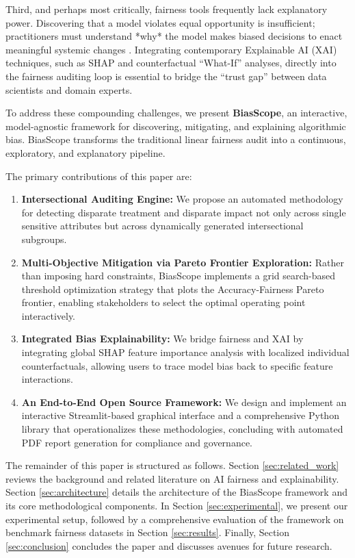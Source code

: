 \documentclass[conference]{IEEEtran}
\begin{document}
Third, and perhaps most critically, fairness tools frequently lack explanatory power. Discovering that a model violates equal opportunity is insufficient; practitioners must understand *why* the model makes biased decisions to enact meaningful systemic changes \cite{rudin2019stop}. Integrating contemporary Explainable AI (XAI) techniques, such as SHAP and counterfactual ``What-If'' analyses, directly into the fairness auditing loop is essential to bridge the ``trust gap'' between data scientists and domain experts.

To address these compounding challenges, we present \textbf{BiasScope}, an interactive, model-agnostic framework for discovering, mitigating, and explaining algorithmic bias. BiasScope transforms the traditional linear fairness audit into a continuous, exploratory, and explanatory pipeline.

The primary contributions of this paper are:
\begin{enumerate}
    \item \textbf{Intersectional Auditing Engine:} We propose an automated methodology for detecting disparate treatment and disparate impact not only across single sensitive attributes but across dynamically generated intersectional subgroups.
    \item \textbf{Multi-Objective Mitigation via Pareto Frontier Exploration:} Rather than imposing hard constraints, BiasScope implements a grid search-based threshold optimization strategy that plots the Accuracy-Fairness Pareto frontier, enabling stakeholders to select the optimal operating point interactively.
    \item \textbf{Integrated Bias Explainability:} We bridge fairness and XAI by integrating global SHAP feature importance analysis with localized individual counterfactuals, allowing users to trace model bias back to specific feature interactions.
    \item \textbf{An End-to-End Open Source Framework:} We design and implement an interactive Streamlit-based graphical interface and a comprehensive Python library that operationalizes these methodologies, concluding with automated PDF report generation for compliance and governance.
\end{enumerate}

The remainder of this paper is structured as follows. Section \ref{sec:related_work} reviews the background and related literature on AI fairness and explainability. Section \ref{sec:architecture} details the architecture of the BiasScope framework and its core methodological components. In Section \ref{sec:experimental}, we present our experimental setup, followed by a comprehensive evaluation of the framework on benchmark fairness datasets in Section \ref{sec:results}. Finally, Section \ref{sec:conclusion} concludes the paper and discusses avenues for future research.
\end{document}
